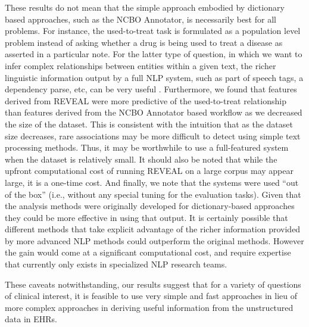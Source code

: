 These results do not mean that the simple approach embodied by
dictionary based approaches, such as the NCBO Annotator, is
necessarily best for all problems.  For instance, the used-to-treat
task is formulated as a population level problem instead of asking
whether a drug is being used to treat a disease as asserted in a
particular note.  For the latter type of question, in which we want to
infer complex relationships between entities within a given text, the
richer linguistic information output by a full NLP system, such as
part of speech tags, a dependency parse, etc, can be very useful
\cite{Goldstein2009}.  Furthermore, we found that features derived
from REVEAL were more predictive of the used-to-treat relationship
than features derived from the NCBO Annotator based workflow as we
decreased the size of the dataset.  This is consistent with the
intuition that as the dataset size decreases, rare associations may be
more difficult to detect using simple text processing methods.  Thus,
it may be worthwhile to use a full-featured system when the dataset is
relatively small.  It should also be noted that while the upfront
computational cost of running REVEAL on a large corpus may appear
large, it is a one-time cost.  And finally, we note that the systems
were used “out of the box” (i.e., without any special tuning for the
evaluation tasks).  Given that the analysis methods were originally
developed for dictionary-based approaches they could be more effective
in using that output.  It is certainly possible that different methods
that take explicit advantage of the richer information provided by
more advanced NLP methods could outperform the original
methods. However the gain would come at a significant computational
cost, and require expertise that currently only exists in specialized
NLP research teams.

These caveats notwithstanding, our results suggest that for a variety
of questions of clinical interest, it is feasible to use very simple
and fast approaches in lieu of more complex approaches in deriving
useful information from the unstructured data in EHRs.

